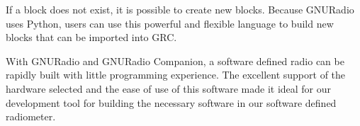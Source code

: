 If a block does not exist, it is possible to create new blocks.  Because GNURadio uses Python, users can use this powerful and flexible language to build new blocks that can be imported into GRC.  



With GNURadio and GNURadio Companion, a software defined radio can be rapidly built with little programming experience.  The excellent support of the hardware selected and the ease of use of this software made it ideal for our development tool for building the necessary software in our software defined radiometer.





